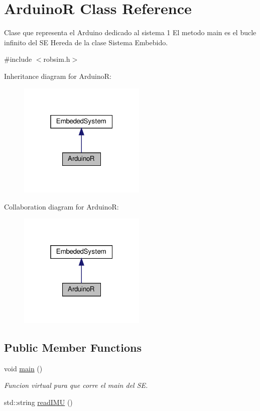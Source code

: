 \hypertarget{classArduinoR}{}\section{ArduinoR Class Reference}
\label{classArduinoR}


Clase que representa el Arduino dedicado al sistema 1 El metodo main es el bucle infinito del SE Hereda de la clase Sistema Embebido.  




{\ttfamily \#include $<$robsim.\+h$>$}



Inheritance diagram for ArduinoR\+:\nopagebreak
\begin{figure}[H]
\begin{center}
\leavevmode
\includegraphics[width=172pt]{classArduinoR__inherit__graph}
\end{center}
\end{figure}


Collaboration diagram for ArduinoR\+:\nopagebreak
\begin{figure}[H]
\begin{center}
\leavevmode
\includegraphics[width=172pt]{classArduinoR__coll__graph}
\end{center}
\end{figure}
\subsection*{Public Member Functions}
\begin{DoxyCompactItemize}
\item 
void \hyperlink{classArduinoR_a479b06fd9527e9810b37b91da8fb0f7e}{main} ()
\begin{DoxyCompactList}\small\item\em Funcion virtual pura que corre el main del SE. \end{DoxyCompactList}\item 
std\+::string \hyperlink{classArduinoR_a8365ffa8bde5c67337aa9b31fe08f83f}{read\+I\+MU} ()
\end{DoxyCompactItemize}



